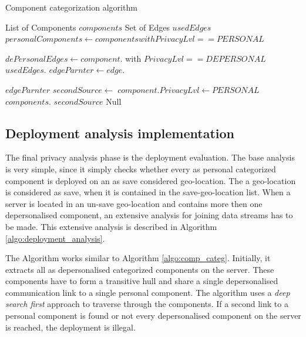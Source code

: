 \begin{algorithm}[h]
	\caption{Component categorization algorithm}
	\label{algo:comp_categ}
\begin{algorithmic}[1]
	
	\State List of Components $components$
	\State Set of Edges $usedEdges$ 
	\State
	\State
		$personalComponents\gets components with PrivacyLvl == PERSONAL$
		\State
			\State
		\EndFor
	\EndProcedure \State
	
	\State
		$dePersonalEdges\gets component.$ with $PrivacyLvl == DEPERSONAL$
		\State
			 \State 
			\Else \State
				$usedEdges.$ \State
				$edgeParnter\gets edge.$ \State
				
				 \State
					\Return $edgeParnter$
				\Else \State
					$secondSource\gets$ 
					 \State
						$component.PrivacyLvl\gets PERSONAL$ \State
						$components.$ \State
						\Return $secondSource$
					\EndIf
				\EndIf 
			\EndIf
		\EndFor \State
		\Return Null
	\EndFunction
\end{algorithmic}
\end{algorithm}



\subsection{Deployment analysis implementation}

The final privacy analysis phase is the deployment evaluation. The base analysis is very simple, since it simply checks whether every as personal categorized component is deployed on an as save considered geo-location. The a geo-location is considered as save, when it is contained in the save-geo-location list. When a server is located in an un-save geo-location and contains more then one depersonalised component, an extensive analysis for joining data streams has to be made. This extensive analysis is described in Algorithm \autoref{algo:deployment_analysis}.

The Algorithm works similar to Algorithm \ref{algo:comp_categ}. Initially, it extracts all as depersonalised categorized components on the server. These components have to form a transitive hull and share a single depersonalised communication link to a single personal component. The algorithm uses a \textit{deep search first} approach to traverse through the components. If a second link to a personal component is found or not every depersonalised component on the server is reached, the deployment is illegal.


